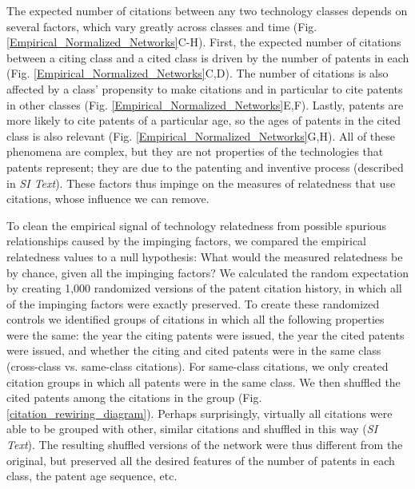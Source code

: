 \documentclass[pre,reprint,groupedaddress,superscriptaddress]{revtex4-1}
\begin{document}
The expected number of citations between any two technology classes depends on several factors, which vary greatly across classes and time (Fig. \ref{Empirical_Normalized_Networks}C-H). First, the expected number of citations between a citing class and a cited class is driven by the number of patents in each (Fig. \ref{Empirical_Normalized_Networks}C,D). The number of citations is also affected by a class' propensity to make citations and in particular to cite patents in other classes (Fig. \ref{Empirical_Normalized_Networks}E,F). Lastly, patents are more likely to cite patents of a particular age, so the ages of patents in the cited class is also relevant (Fig. \ref{Empirical_Normalized_Networks}G,H). All of these phenomena are complex, but they are not properties of the technologies that patents represent; they are due to the patenting and inventive process (described in \textit{SI Text}). These factors thus impinge on the measures of relatedness that use citations, whose influence we can remove. 

To clean the empirical signal of technology relatedness from possible spurious relationships caused by the impinging factors, we compared the empirical relatedness values to a null hypothesis: What would the measured relatedness be by chance, given all the impinging factors? We calculated the random expectation by creating 1,000 randomized versions of the patent citation history, in which all of the impinging factors were exactly preserved. To create these randomized controls we identified groups of citations in which all the following properties were the same: the year the citing patents were issued, the year the cited patents were issued, and whether the citing and cited patents were in the same class (cross-class vs. same-class citations). For same-class citations, we only created citation groups in which all patents were in the same class. We then shuffled the cited patents among the citations in the group (Fig. \ref{citation_rewiring_diagram}). Perhaps surprisingly, virtually all citations were able to be grouped with other, similar citations and shuffled in this way (\textit{SI Text}). The resulting shuffled versions of the network were thus different from the original, but preserved all the desired features of the number of patents in each class, the patent age sequence, etc. 
\end{document}
